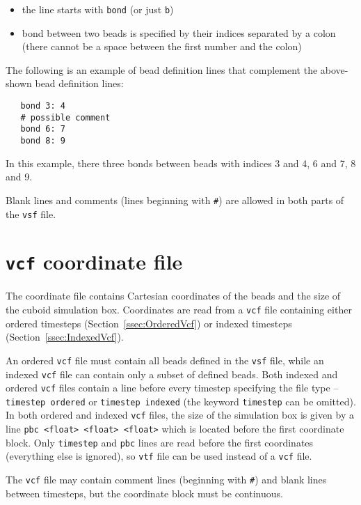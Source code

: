 \begin{itemize}[topsep=0pt,itemsep=0pt]
  \item the line starts with \texttt{bond} (or just \texttt{b})
  \item bond between two beads is specified by their indices separated by a
    colon (there cannot be a space between the first number and the colon)
\end{itemize}

The following is an example of bead definition lines that complement the
above-shown bead definition lines:

\begin{verbatim}
   bond 3: 4
   # possible comment
   bond 6: 7
   bond 8: 9
\end{verbatim}

In this example, there three bonds between beads with indices 3 and 4, 6
and 7, 8 and 9.

Blank lines and comments (lines beginning with \texttt{\#}) are allowed in
both parts of the \texttt{vsf} file.

\section{\texttt{vcf} coordinate file} \label{sec:CoordinateVcf}

The coordinate file contains Cartesian coordinates of the beads and the
size of the cuboid simulation box.
Coordinates are read from a \texttt{vcf} file
containing either ordered timesteps (Section~\ref{ssec:OrderedVcf}) or
indexed timesteps (Section~\ref{ssec:IndexedVcf}).

An ordered \texttt{vcf} file must contain all beads defined in the
\texttt{vsf} file, while an indexed \texttt{vcf} file can contain only a
subset of defined beads. Both indexed and ordered \texttt{vcf} files
contain a line before every timestep specifying the file type --
\texttt{timestep ordered} or \texttt{timestep indexed} (the keyword
\texttt{timestep} can be omitted).  In both ordered and indexed
\texttt{vcf} files, the size of the simulation box is given by a line
\texttt{pbc <float> <float> <float>} which is located before the first
coordinate block. Only \texttt{timestep} and \texttt{pbc} lines are read
before the first coordinates (everything else is ignored), so \texttt{vtf}
file can be used instead of a \texttt{vcf} file.

The \texttt{vcf} file may contain comment lines (beginning with
\texttt{\#}) and blank lines between timesteps, but the coordinate block
must be continuous.

